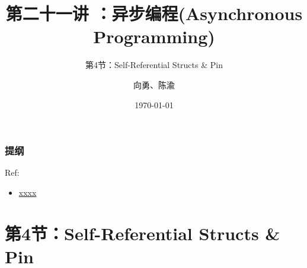 


\title[第21讲]{第二十一讲 ：异步编程(Asynchronous Programming)} %
\subtitle{第4节：Self-Referential Structs \& Pin}
\author{向勇、陈渝} %
\date{\today} %



\begin{frame}
\titlepage %
\end{frame}

\begin{frame}
\frametitle{提纲} %
\tableofcontents %

Ref:
    \begin{itemize}
        \item \href{}{xxxx}
    \end{itemize}

\end{frame}
\section{第4节：Self-Referential Structs \& Pin} %
